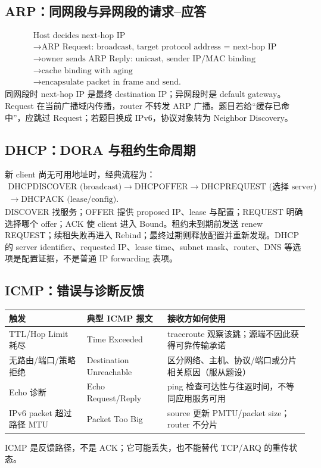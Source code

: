 \documentclass[11pt,a4paper]{ctexart}
\begin{document}
\subsection{ARP：同网段与异网段的请求--应答}

\[
\begin{array}{l}
\text{Host decides next-hop IP}\\
\to\text{ARP Request: broadcast, target protocol address = next-hop IP}\\
\to\text{owner sends ARP Reply: unicast, sender IP/MAC binding}\\
\to\text{cache binding with aging}\\
\to\text{encapsulate packet in frame and send.}
\end{array}
\]
同网段时 next-hop IP 是最终 destination IP；异网段时是 default gateway。Request 在当前广播域内传播，router 不转发 ARP 广播。题目若给“缓存已命中”，应跳过 Request；若题目换成 IPv6，协议对象转为 Neighbor Discovery。

\subsection{DHCP：DORA 与租约生命周期}

新 client 尚无可用地址时，经典流程为：
\[
\begin{gathered}
\text{DHCPDISCOVER (broadcast)}\to\text{DHCPOFFER}\to\text{DHCPREQUEST (选择 server)}\\
\to\text{DHCPACK (lease/config)}.
\end{gathered}
\]
DISCOVER 找服务；OFFER 提供 proposed IP、lease 与配置；REQUEST 明确选择哪个 offer；ACK 使 client 进入 Bound。租约未到期前发送 renew REQUEST；续租失败再进入 Rebind；最终过期则释放配置并重新发现。DHCP 的 server identifier、requested IP、lease time、subnet mask、router、DNS 等选项是配置证据，不是普通 IP forwarding 表项。

\subsection{ICMP：错误与诊断反馈}

\begin{center}\small
\begin{tabularx}{\linewidth}{L{3.2cm}Y Y}
\toprule
触发 & 典型 ICMP 报文 & 接收方如何使用\\
\midrule
TTL/Hop Limit 耗尽 & Time Exceeded & traceroute 观察该跳；源端不因此获得可靠传输承诺\\
无路由/端口/策略拒绝 & Destination Unreachable & 区分网络、主机、协议/端口或分片相关原因（服从题设）\\
Echo 诊断 & Echo Request/Reply & ping 检查可达性与往返时间，不等同应用服务可用\\
IPv6 packet 超过路径 MTU & Packet Too Big & source 更新 PMTU/packet size；router 不分片\\
\bottomrule
\end{tabularx}\end{center}
ICMP 是反馈路径，不是 ACK；它可能丢失，也不能替代 TCP/ARQ 的重传状态。
\end{document}
